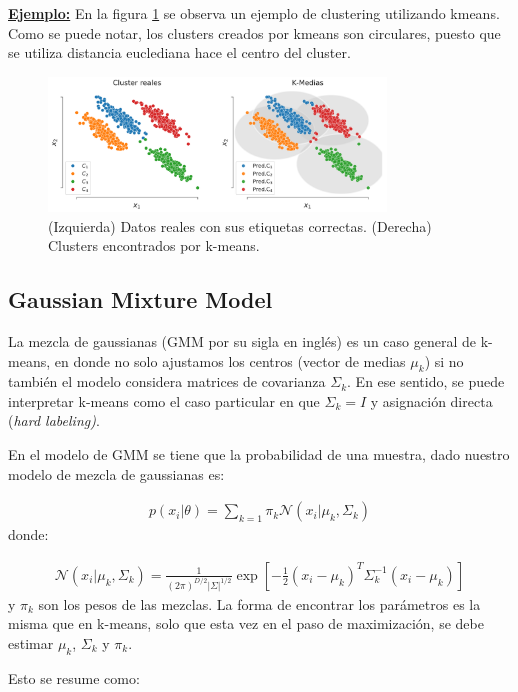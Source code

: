 \underline{\textbf{Ejemplo:}} En la figura \ref{fig:kmeans} se observa un ejemplo de clustering utilizando kmeans. Como se puede notar, los clusters creados por kmeans son circulares, puesto que se utiliza distancia euclediana hace el centro del cluster.

\begin{figure}[ht]
  \centering
  \includegraphics[width=0.8\textwidth]{img/cap7_k_medias}
  \caption{(Izquierda) Datos reales con sus etiquetas correctas. (Derecha) Clusters encontrados por k-means.}
  \label{fig:kmeans}
\end{figure}

\subsection{Gaussian Mixture Model}

La mezcla de gaussianas (GMM por su sigla en inglés) es un caso general de k-means, en donde no solo ajustamos los centros (vector de medias $\mu_k$) si no también el modelo considera matrices de covarianza $\Sigma_k$. En ese sentido, se puede interpretar k-means como el caso particular en que $\Sigma_k = I$ y asignación directa (\emph{hard labeling)}.

En el modelo de GMM se tiene que la probabilidad de una muestra, dado nuestro modelo de mezcla de gaussianas es:

\begin{align}
p(x_i|\theta) = \sum_{k=1} \pi_k \mathcal{N}(x_i| \mu_k,\Sigma_k)
\end{align}
donde:

\begin{align}
\mathcal{N}(x_i| \mu_k,\Sigma_k) = \frac{1}{(2\pi)^{D/2}|\Sigma|^{1/2}}\exp \left[ -\frac{1}{2}(x_i-\mu_k)^T \Sigma_k^{-1}(x_i-\mu_k) \right]
\end{align}
y $\pi_k$ son los pesos de las mezclas. La forma de encontrar los parámetros es la misma que en k-means, solo que esta vez en el paso de maximización, se debe estimar $\mu_k$, $\Sigma_k$ y $\pi_k$.

Esto se resume como:

